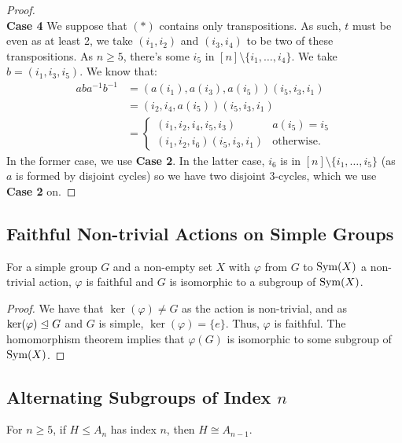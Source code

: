 \begin{proof}
    \\[\baselineskip]
    \textbf{Case 4}
    We suppose that $(\ast)$ contains only transpositions.
    As such, $t$ must be even as at least 2, we take $(i_1, i_2)$
    and $(i_3, i_4)$ to be two of these transpositions. As $n \geq 5$,
    there's some $i_5$ in $[n] \setminus \{i_1, \ldots, i_4\}$. We
    take $b = (i_1, i_3, i_5)$. We know that: \begin{align*}
        aba^{-1}b^{-1}
        &= (a(i_1), a(i_3), a(i_5))(i_5, i_3, i_1) \\
        &= (i_2, i_4, a(i_5))(i_5, i_3, i_1) \\
        &= \begin{cases}
            (i_1, i_2, i_4, i_5, i_3) & a(i_5) = i_5 \\
            (i_1, i_2, i_6)(i_5, i_3, i_1) & \text{otherwise}.
        \end{cases}
    \end{align*} In the former case, we use \textbf{Case 2}.
    In the latter case, $i_6$ is in $[n] \setminus 
    \{i_1, \ldots, i_5\}$ (as $a$ is formed by disjoint cycles)
    so we have two disjoint 3-cycles, which we use \textbf{Case 2}
    on.
\end{proof}

\subsection{Faithful Non-trivial Actions on Simple Groups} \label{7.13}

For a simple group $G$ and a non-empty set $X$ with $\varphi$
from $G$ to $\operatorname{Sym}(X)$ a non-trivial action, $\varphi$ is
faithful and $G$ is isomorphic to a subgroup of $\operatorname{Sym}(X)$.

\begin{proof}
    We have that $\ker(\varphi) \neq G$ as the action is non-trivial,
    and as $\ker(\varphi) \trianglelefteq G$ and $G$ is simple, $\ker(\varphi)
    = \{e\}$. Thus, $\varphi$ is faithful. The homomorphism theorem
    implies that $\varphi(G)$ is isomorphic to some subgroup of 
    $\operatorname{Sym}(X)$.
\end{proof}

\subsection{Alternating Subgroups of Index $n$} \label{7.12}

For $n \geq 5$, if $H \leq A_n$ has index $n$, then $H \cong A_{n - 1}$.

